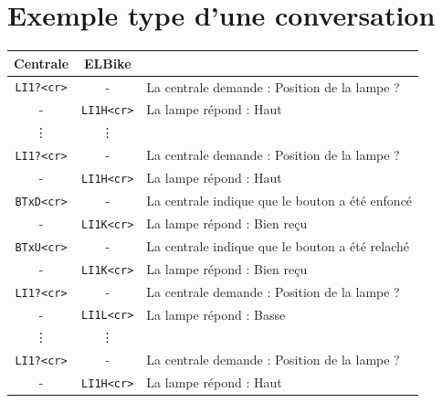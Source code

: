 \documentclass[a4paper, 10pt]{article} %
\newcommand{\rien}{-}
\begin{document}
\section{Exemple type d'une conversation}
\begin{center}
\begin{tabular}{|c|c|p{6cm}|}
\hline
Centrale&ELBike&\\
\hline
\hline
\verb|LI1?<cr>|&\rien& La centrale demande : Position de la lampe ?\\
\rien&\verb|LI1H<cr>|& La lampe répond : Haut\\
\hline
\vdots&\vdots& 	\\
\hline
\verb|LI1?<cr>|&\rien& La centrale demande : Position de la lampe ?\\
\rien&\verb|LI1H<cr>|& La lampe répond : Haut\\
\hline
\verb|BTxD<cr>|&\rien& La centrale indique que le bouton a été enfoncé\\
\rien&\verb|LI1K<cr>|& La lampe répond : Bien reçu\\
\hline
\verb|BTxU<cr>|&\rien& La centrale indique que le bouton a été relaché\\
\rien&\verb|LI1K<cr>|& La lampe répond : Bien reçu\\
\hline
\verb|LI1?<cr>|&\rien& La centrale demande : Position de la lampe ?\\
\rien&\verb|LI1L<cr>|& La lampe répond : Basse\\
\hline
\vdots&\vdots& 	\\
\hline
\verb|LI1?<cr>|&\rien& La centrale demande : Position de la lampe ?\\
\rien&\verb|LI1H<cr>|& La lampe répond : Haut\\
\hline
\end{tabular}
\end{center}
\end{document}
